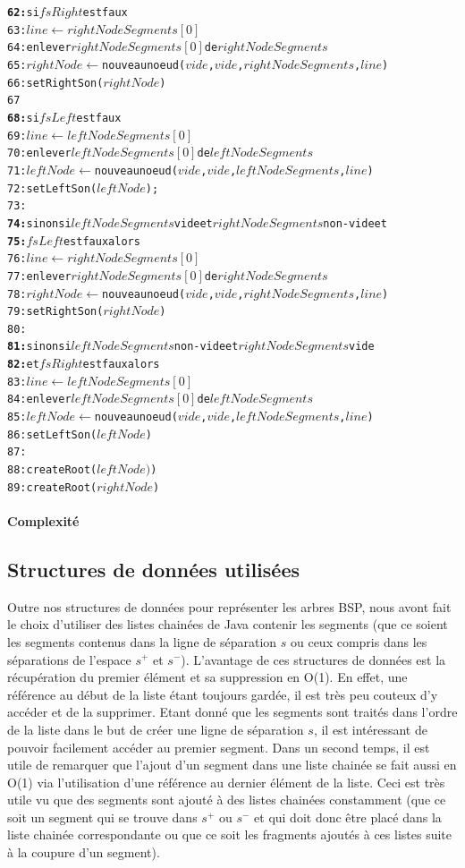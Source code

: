 \documentclass[11pt,a4paper]{article}
\begin{document}
\begin{alltt}
\textbf{62:}	    si \(fsRight\) est faux
63:       \(line \leftarrow rightNodeSegments[0]\)
64:       enlever \(rightNodeSegments[0]\) de \(rightNodeSegments\)
65:       \(rightNode \leftarrow\) nouveau noeud (\(vide\), \(vide\), \(rightNodeSegments\), \(line\))
66:       setRightSon(\(rightNode\))
67
\textbf{68:}	    si \(fsLeft\) est faux
69:       \(line \leftarrow leftNodeSegments[0]\)
70:       enlever \(leftNodeSegments[0]\) de \(leftNodeSegments\)
71:       \(leftNode \leftarrow\) nouveau noeud (\(vide\), \(vide\), \(leftNodeSegments\), \(line\))
72:       setLeftSon(\(leftNode\));
73:     
\textbf{74:}   sinon si \(leftNodeSegments\) vide et \(rightNodeSegments\) non-vide et
\textbf{75:}   \(fsLeft\) est faux alors
76:     \(line \leftarrow rightNodeSegments[0]\)
77:     enlever \(rightNodeSegments[0]\) de \(rightNodeSegments\)
78:     \(rightNode \leftarrow \) nouveau noeud (\(vide\), \(vide\), \(rightNodeSegments\), \(line\))
79:     setRightSon(\(rightNode\))
80:    
\textbf{81:}   sinon si \(leftNodeSegments\) non-vide et \(rightNodeSegments\) vide 
\textbf{82:}   et \(fsRight\) est faux alors
83:     \(line \leftarrow leftNodeSegments[0]\)
84:     enlever \(leftNodeSegments[0]\) de \(leftNodeSegments\)
85:     \(leftNode \leftarrow \) nouveau noeud (\(vide\), \(vide\), \(leftNodeSegments\), \(line\))
86:     setLeftSon(\(leftNode\))
87:     
88:   createRoot(\(leftNode)\))
89:   createRoot(\(rightNode\))
\end{alltt}

\paragraph{Complexité}

\subsection{Structures de données utilisées}
Outre nos structures de données pour représenter les arbres BSP, nous avont fait le choix d'utiliser des listes chainées de Java contenir les segments (que ce soient les segments contenus dans la ligne de séparation $s$ ou ceux compris dans les séparations de l'espace $s^+$ et $s^-$). 
L'avantage de ces structures de données est la récupération du premier élément et sa suppression en O(1). En effet, une référence au début de la liste étant toujours gardée, il est très peu couteux d'y accéder et de la supprimer. Etant donné que les segments sont traités dans l'ordre de la liste dans le but de créer une ligne de séparation $s$, il est intéressant de pouvoir facilement accéder au premier segment. 
Dans un second temps, il est utile de remarquer que l'ajout d'un segment dans une liste chainée se fait aussi en O(1) via l'utilisation d'une référence au dernier élément de la liste. Ceci est très utile vu que des segments sont ajouté à des listes chainées constamment (que ce soit un segment qui se trouve dans $s^+$ ou $s^-$ et qui doit donc être placé dans la liste chainée correspondante ou que ce soit les fragments ajoutés à ces listes suite à la coupure d'un segment).
\end{document}
